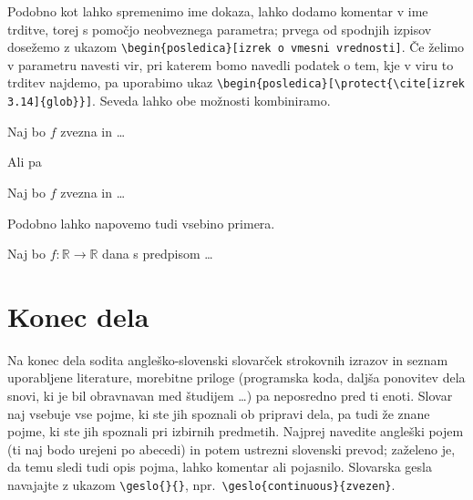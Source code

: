 \documentclass[mat1]{fmfdelo}
\newcommand{\R}{\mathbb R}
\begin{document}
Podobno kot lahko spremenimo ime dokaza, lahko dodamo komentar v ime trditve, torej s pomočjo neobveznega parametra; prvega od spodnjih izpisov dosežemo z ukazom
\verb|\begin{posledica}[izrek o vmesni vrednosti]|. Če želimo v parametru navesti vir, pri katerem bomo navedli podatek o tem, kje v viru to trditev najdemo, pa uporabimo ukaz \verb|\begin{posledica}[\protect{\cite[izrek 3.14]{glob}}]|. Seveda lahko obe možnosti kombiniramo.


\begin{posledica}
Naj bo $f$ zvezna in \ldots
\end{posledica}

Ali pa

\begin{posledica}
Naj bo $f$ zvezna in \ldots
\end{posledica}

Podobno lahko napovemo tudi vsebino primera.

\begin{primer}
Naj bo $f \colon \R \to \R$ dana s predpisom \dots
\end{primer}

\section{Konec dela}

Na konec dela sodita angleško-slovenski slovarček strokovnih izrazov in seznam uporabljene literature, morebitne priloge (programska koda, daljša ponovitev dela snovi, ki je bil obravnavan med študijem \dots) pa neposredno pred ti enoti. Slovar naj vsebuje vse pojme, ki ste jih spoznali ob pripravi dela, pa tudi že znane pojme, ki ste jih spoznali pri izbirnih predmetih. Najprej navedite angleški pojem (ti naj bodo urejeni po abecedi) in potem ustrezni slovenski prevod; zaželeno je, da temu sledi tudi opis pojma, lahko komentar ali pojasnilo. Slovarska gesla navajajte z ukazom \verb|\geslo{}{}|, npr.\ \verb|\geslo{continuous}{zvezen}|.
\end{document}
